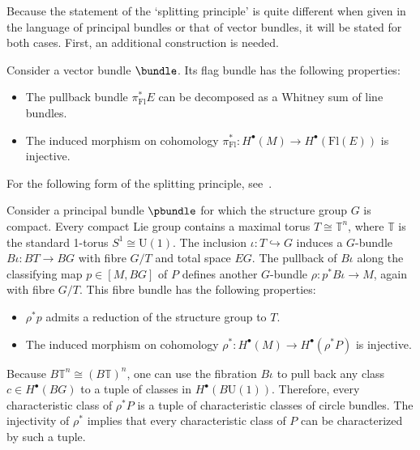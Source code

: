     Because the statement of the `splitting principle' is quite different when given in the language of principal bundles or that of vector bundles, it will be stated for both cases. First, an additional construction is needed.
    \begin{theorem}
        Consider a vector bundle $\bundle$. Its flag bundle has the following properties:
        \begin{itemize}
            \item The pullback bundle $\pi_{\text{Fl}}^*E$ can be decomposed as a Whitney sum of line bundles.
            \item The induced morphism on cohomology $\pi_{\text{Fl}}^*:H^\bullet(M)\rightarrow H^\bullet(\mathrm{Fl}(E))$ is injective.
        \end{itemize}
    \end{theorem}
    For the following form of the splitting principle, see~\citet{may_note_2005,debray_characteristic_2018}.
    \begin{theorem}
        Consider a principal bundle $\pbundle$ for which the structure group $G$ is compact. Every compact Lie group contains a maximal torus $T\cong\mathbb{T}^n$, where $\mathbb{T}$ is the standard 1-torus $S^1\cong\mathrm{U}(1)$. The inclusion $\iota:T\hookrightarrow G$ induces a $G$-bundle $B\iota:BT\rightarrow BG$ with fibre $G/T$ and total space $EG$. The pullback of $B\iota$ along the classifying map $p\in[M,BG]$ of $P$ defines another $G$-bundle $\rho:p^*B\iota\rightarrow M$, again with fibre $G/T$. This fibre bundle has the following properties:
        \begin{itemize}
            \item $\rho^*p$ admits a reduction of the structure group to $T$.
            \item The induced morphism on cohomology $\rho^*:H^\bullet(M)\rightarrow H^\bullet(\rho^*P)$ is injective.
        \end{itemize}
    \end{theorem}
    Because $B\mathbb{T}^n\cong(B\mathbb{T})^n$, one can use the fibration $B\iota$ to pull back any class $c\in H^\bullet(BG)$ to a tuple of classes in $H^\bullet(B\mathrm{U}(1))$. Therefore, every characteristic class of $\rho^*P$ is a tuple of characteristic classes of circle bundles. The injectivity of $\rho^*$ implies that every characteristic class of $P$ can be characterized by such a tuple.


